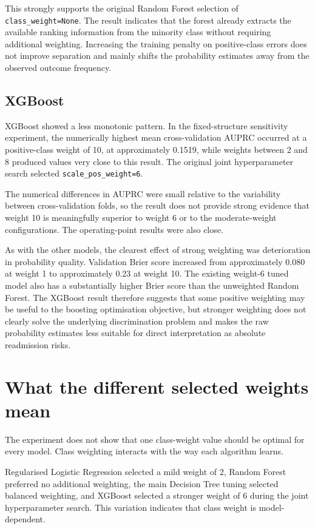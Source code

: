 \documentclass[11pt,a4paper]{article}
\begin{document}
This strongly supports the original Random Forest selection of \texttt{class\_weight=None}. The result indicates that the forest already extracts the available ranking information from the minority class without requiring additional weighting. Increasing the training penalty on positive-class errors does not improve separation and mainly shifts the probability estimates away from the observed outcome frequency.

\subsection{XGBoost}

XGBoost showed a less monotonic pattern. In the fixed-structure sensitivity experiment, the numerically highest mean cross-validation AUPRC occurred at a positive-class weight of 10, at approximately 0.1519, while weights between 2 and 8 produced values very close to this result. The original joint hyperparameter search selected \texttt{scale\_pos\_weight=6}.

The numerical differences in AUPRC were small relative to the variability between cross-validation folds, so the result does not provide strong evidence that weight 10 is meaningfully superior to weight 6 or to the moderate-weight configurations. The operating-point results were also close.

As with the other models, the clearest effect of strong weighting was deterioration in probability quality. Validation Brier score increased from approximately 0.080 at weight 1 to approximately 0.23 at weight 10. The existing weight-6 tuned model also has a substantially higher Brier score than the unweighted Random Forest. The XGBoost result therefore suggests that some positive weighting may be useful to the boosting optimisation objective, but stronger weighting does not clearly solve the underlying discrimination problem and makes the raw probability estimates less suitable for direct interpretation as absolute readmission risks.

\section{What the different selected weights mean}

The experiment does not show that one class-weight value should be optimal for every model. Class weighting interacts with the way each algorithm learns.

Regularised Logistic Regression selected a mild weight of 2, Random Forest preferred no additional weighting, the main Decision Tree tuning selected balanced weighting, and XGBoost selected a stronger weight of 6 during the joint hyperparameter search. This variation indicates that class weight is model-dependent.
\end{document}
